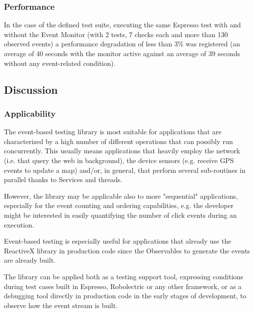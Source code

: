 \documentclass[11pt,a4paper,notitlepage]{article}
\begin{document}
\subsubsection{Performance}
In the case of the defined test suite, executing the same Espresso test with and without the Event Monitor (with 2 tests, 7 checks each and more than 130 observed events) a performance degradation of less than 3\% was registered (an average of 40 seconds with the monitor active against an average of 39 seconds without any event-related condition).

\subsection{Discussion}

\subsubsection{Applicability}
The event-based testing library is most suitable for applications that are characterized by a high number of different operations that can possibly run concurrently. This usually means applications that heavily employ the network (i.e. that query the web in background), the device sensors (e.g. receive GPS events to update a map) and/or, in general, that perform several sub-routines in parallel thanks to Services and threads.

However, the library may be applicable also to more "sequential" applications, especially for the event counting and ordering capabilities, e.g. the developer might be interested in easily quantifying the number of click events during an execution.

Event-based testing is especially useful for applications that already use the ReactiveX library in production code since the Observables to generate the events are already built.

The library can be applied both as a testing support tool, expressing conditions during test cases built in Espresso, Robolectric or any other framework, or as a debugging tool directly in production code in the early stages of development, to observe how the event stream is built.
\end{document}

